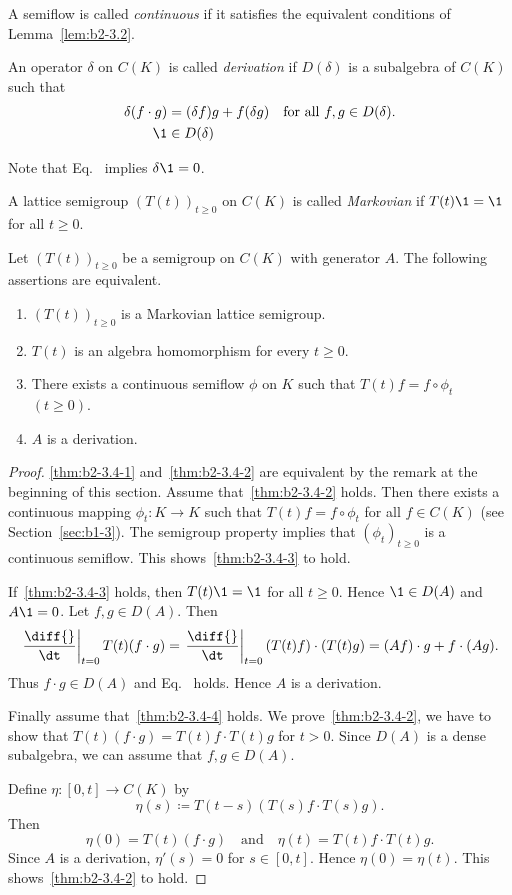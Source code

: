A semiflow is called \emph{continuous} if it satisfies the equivalent conditions of Lemma~\ref{lem:b2-3.2}.
\begin{definition}\label{def:b2-3.3}
An operator $\delta$ on $C(K)$ is called \emph{derivation} if\/ $D(\delta)$ is a subalgebra of\/ $C(K)$ such that
\begin{align}
\delta(f \cdot g) &= (\delta f)g + f(\delta g) \quad \text{for all } f,g \in D(\delta). \label{eq:b2-3.4} \\
\1 &\in D(\delta) \label{eq:b2-3.5}
\end{align}
\end{definition}
Note that Eq.~ implies $\delta\1 = 0$.

A lattice semigroup $(T(t))_{t \geq 0}$ on $C(K)$ is called \emph{Markovian} if\/ $T(t)\1 = \1$ for all $t \geq 0$.
\begin{theorem}\label{thm:b2-3.4}
Let $(T(t))_{t \geq 0}$ be a semigroup on $C(K)$ with generator $A$.
The following assertions are equivalent.
\begin{enumerate}[\upshape (a)]
\item \label{thm:b2-3.4-1}
$(T(t))_{t \geq 0}$ is a Markovian lattice semigroup.
\item \label{thm:b2-3.4-2}
$T(t)$ is an algebra homomorphism for every $t \geq 0$.
\item \label{thm:b2-3.4-3}
There exists a continuous semiflow $\phi$ on $K$ such that $T(t)f = f \circ \phi_{t}$ $(t \geq 0)$.
\item \label{thm:b2-3.4-4}
$A$ is a derivation.
\end{enumerate}
\end{theorem}
\begin{proof}
\ref{thm:b2-3.4-1} and~\ref{thm:b2-3.4-2} are equivalent by the remark at the beginning of this section.
Assume that~\ref{thm:b2-3.4-2} holds.
Then there exists a continuous mapping $\phi_{t} \colon K \to K$ such that $T(t)f = f \circ \phi_{t}$ for all $f \in C(K)$ (see Section~\ref{sec:b1-3}).
The semigroup property implies that $(\phi_{t})_{t \geq 0}$ is a continuous semiflow.
This shows~\ref{thm:b2-3.4-3}  to hold.

If~\ref{thm:b2-3.4-3} holds, then $T(t)\1 = \1$ for all $t \geq 0$. Hence $\1 \in D(A)$ and $A\1 = 0$.
Let $f,g \in D(A)$.
Then 
%
\[
	\left.\frac{\diff{}}{\dt}\right|_{t=0} T(t)(f \cdot g) = \left.\frac{\diff{}}{\dt}\right|_{t=0} (T(t)f) \cdot (T(t)g) = (Af) \cdot g + f \cdot (Ag).
\]
%
Thus $f \cdot g \in D(A)$ and Eq.~ holds.
Hence $A$ is a derivation.

Finally assume that~\ref{thm:b2-3.4-4} holds.
We prove~\ref{thm:b2-3.4-2}, \ie  we have to show that $T(t)(f \cdot g) = T(t)f \cdot T(t)g$ for $t > 0$.
Since $D(A)$ is a dense subalgebra, we can assume that $f,g \in D(A)$.

Define $\eta \colon [0,t] \to C(K)$ by 
%
\[
	\eta(s) \coloneqq T(t-s) ( T(s)f \cdot T(s)g ).
\]
%
Then 
%
\[
	\eta(0) = T(t)(f \cdot g)
	\quad \text{and} \quad
	\eta(t) = T(t)f \cdot T(t)g.
\]
%
Since $A$ is a derivation, $\eta'(s) = 0$ for $s \in [0,t]$.
Hence $\eta(0) = \eta(t)$.
This shows~\ref{thm:b2-3.4-2} to hold.
\end{proof}
